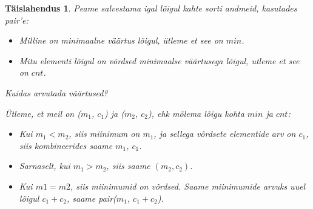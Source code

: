 \documentclass{trkut}
\newtheorem*{solution}{Täislahendus}
\begin{document}
\begin{solution}
Peame salvestama igal lõigul kahte sorti andmeid, kasutades pair'e:
\begin{itemize}
\item Milline on minimaalne väärtus lõigul, ütleme et see on $min$.
\item Mitu elementi lõigul on võrdsed minimaalse väärtusega lõigul, utleme et see on $cnt$.
\end{itemize}

Kuidas arvutada väärtused?

Ütleme, et meil on ($m_1$, $c_1$) ja ($m_2$, $c_2$), ehk mõlema lõigu kohta $min$ ja $cnt$:
\begin{itemize}
\item Kui $m_1<m_2$, siis miinimum on $m_1$, ja sellega võrdsete elementide arv on $c_1$, siis kombineerides saame $m_1$, $c_1$. 
\item Sarnaselt, kui $m_1>m_2$, siis saame $(m_2,c_2)$. 
\item Kui $m1=m2$, siis miinimumid on võrdsed. Saame miinimumide arvuks uuel lõigul $c_1+c_2$, saame pair($m_1$, $c_1+c_2$).
\end{itemize}
\end{solution}
\end{document}
